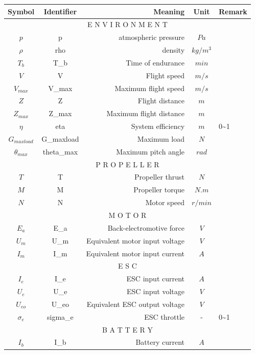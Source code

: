 \documentclass{article} %
\numberwithin{equation}{section} %
\begin{document}
{\footnotesize
\begin{tabular}{c|c|r|c|l}
\toprule
\textbf{Symbol} 		& \textbf{Identifier} & \textbf{Meaning} 			& \textbf{Unit} 	& \textbf{Remark} \\
\hline
\multicolumn{5}{c}{E N V I R O N M E N T}\\ 
\hline
$p$       		  		& p				& atmospheric pressure              & $Pa$         		& \\
$\rho$    		  		& rho			& density                           & $kg/m^3$   		& \\
$T_b$      				& T\_b			& Time of endurance                 & $min$        		& \\
$V$        				& V				& Flight speed                      & $m/s$        		& \\
$V_{max}$  				& V\_max		& Maximum flight speed              & $m/s$        		& \\
$Z$        				& Z				& Flight distance                   & $m$          		& \\
$Z_{max}$  				& Z\_max		& Maximum flight distance           & $m$          		& \\
$\eta$  				& eta			& System efficiency           		& $m$          		& 0\~{}1 \\
$G_{maxload}$			& G\_maxload	& Maximum load		           		& $N$          		& \\
$\theta_{max}$			& theta\_max	& Maximum pitch angle          		& $rad$        		& \\
\hline
\multicolumn{5}{c}{P R O P E L L E R}\\ 
\hline
$T$              		& T				& Propeller thrust                  & $N$          		& \\
$M$              		& M				& Propeller torque                  & $N.m$        		& \\
$N$              		& N				& Motor speed                       & $r/min$      		& \\
\hline
\multicolumn{5}{c}{M O T O R}\\ 
\hline
$E_a$            		& E\_a			& Back-electromotive force          & $V$        	  	& \\
$U_m$            		& U\_m			& Equivalent motor input voltage    & $V$        	  	& \\
$I_m$            		& I\_m			& Equivalent motor input current    & $A$        	  	& \\
\hline
\multicolumn{5}{c}{E S C}\\ 
\hline
$I_e$            		& I\_e			& ESC input current                 & $A$    	      	& \\
$U_e$            		& U\_e			& ESC input voltage                 & $V$     	     	& \\
$U_{eo}$         		& U\_eo			& Equivalent ESC output voltage     & $V$      	    	& \\
$\sigma_e$       		& sigma\_e		& ESC throttle                      & -        		  	& 0\~{}1 \\
\hline
\multicolumn{5}{c}{B A T T E R Y}\\ 
\hline
$I_b$            		& I\_b			& Battery current                   & $A$          		& \\
\bottomrule
\end{tabular}
}
\end{document}

